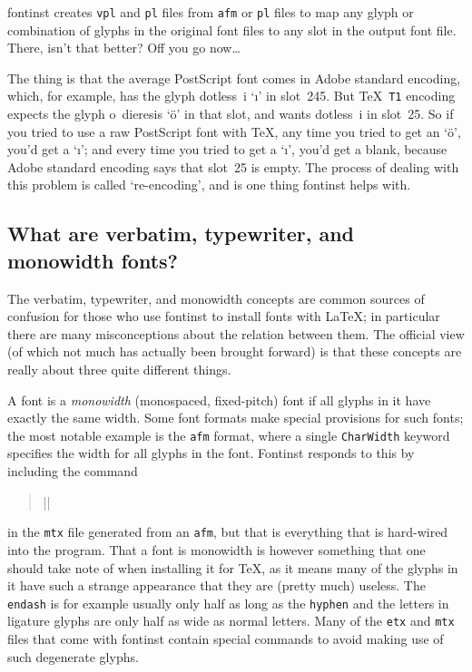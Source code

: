 \documentclass[a4paper]{ltxguide}
\newcommand{\PS}{Post\-Script\xspace}
\newcommand*{\setfilename}[1]{\texttt{#1}}
\newcommand*{\setpackagename}[1]{\textsf{#1}}
\newcommand{\fontinst}{\setpackagename{font\-inst}\xspace}
\newcommand{\Fontinst}{\setpackagename{Font\-inst}\xspace}
\newcommand{\pl} {\setfilename{pl}\xspace}
\newcommand{\afm}{\setfilename{afm}\xspace}
\newcommand{\vpl}{\setfilename{vpl}\xspace}
\newcommand{\mtx}{\setfilename{mtx}\xspace}
\newcommand{\etx}{\setfilename{etx}\xspace}
\begin{document}
\fontinst creates \vpl and \pl files from \afm or \pl files to map
any glyph or combination of glyphs in the original font files to
any slot in the output font file.  There, isn't that better?  Off
you go now\ldots


The thing is that the average \PS font comes in Adobe standard
encoding, which, for example, has the glyph dotless~i `\i' in
slot~245.  But \TeX\ \texttt{T1} encoding expects the glyph o~dieresis
`{\"o}' in that slot, and wants dotless~i in slot~25.  So if you
tried to use a raw \PS font with \TeX, any time you tried to get
an `\"o', you'd get a `\i'; and every time you tried to get a `\i',
you'd get a blank, because Adobe standard encoding says that
slot~25 is empty.  The process of dealing with this problem is
called `re-encoding', and is one thing \fontinst helps with.



\subsection{What are verbatim, typewriter, and monowidth fonts?}

The verbatim, typewriter, and monowidth concepts are common sources 
of confusion for those who use \fontinst to install fonts 
with \LaTeX; in particular 
there are many misconceptions about the relation between them. The 
official view (of which not much has actually been brought forward) 
is that these concepts are really about three quite different things. 

A font is a \emph{monowidth} (monospaced, fixed-pitch) font if all 
glyphs in it have exactly the same width. Some font formats make 
special provisions for such fonts; the most notable example is the 
\afm format, where a single \texttt{CharWidth} keyword specifies the 
width for all glyphs in the font. \Fontinst responds to this 
by including the command
\begin{quote}
  ||
\end{quote}
in the \mtx file generated from an \afm, but that is everything that is 
hard-wired into the program. That a font is monowidth is however 
something that one should take note of when installing it for \TeX, 
as it means many of the glyphs in it have such a strange appearance 
that they are (pretty much) useless. The \texttt{endash} is for 
example usually only half as long as the \texttt{hyphen} and the 
letters in ligature glyphs are only half as wide as normal letters. 
Many of the \etx and \mtx files that come with \fontinst 
contain special commands to avoid making use of such degenerate 
glyphs.
\end{document}
